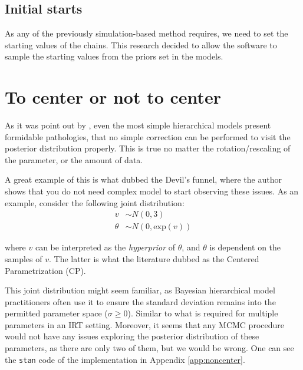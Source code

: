 
\subsection{Initial starts}

As any of the previously simulation-based method requires, we need to set the starting values of the chains. This research decided to allow the software to sample the starting values from the priors set in the models.



\section{To center or not to center} \label{sect:noncenter}

As it was point out by \citet{Betancourt_et_al_2013}, even the most simple hierarchical models present formidable pathologies, that no simple correction can be performed to visit the posterior distribution properly. This is true no matter the rotation/rescaling of the parameter, or the amount of data. 

A great example of this is what \citet{McElreath_2020} dubbed the Devil's funnel, where the author shows that you do not need complex model to start observing these issues. As an example, consider the following joint distribution:
%
\begin{equation} \label{eq:devil}
	\begin{split}	
		v &\sim N(0, 3) \\
		\theta &\sim N(0, \text{exp}(v))
	\end{split}
\end{equation}

\noindent where $v$ can be interpreted as the \textit{hyperprior} of $\theta$, and $\theta$ is dependent on the samples of $v$. The latter is what the literature dubbed as the Centered Parametrization (CP). 

This joint distribution might seem familiar, as Bayesian hierarchical model practitioners often use it to ensure the standard deviation remains into the permitted parameter space ($\sigma \geq 0$). Similar to what is required for multiple parameters in an IRT setting. Moreover, it seems that any MCMC procedure would not have any issues exploring the posterior distribution of these parameters, as there are only two of them, but we would be wrong. One can see the \texttt{stan} code of the implementation in Appendix \ref{app:noncenter}.

